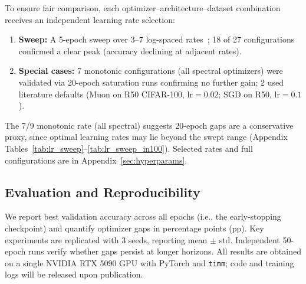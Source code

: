 To ensure fair comparison, each optimizer--architecture--dataset combination receives an independent learning rate selection:
\begin{enumerate}[label=(\alph*),nosep,leftmargin=*]
\item \textbf{Sweep:} A 5-epoch sweep over 3--7 log-spaced rates~\cite{schmidt2021crowdedvalley}; 18 of 27 configurations confirmed a clear peak (accuracy declining at adjacent rates).
\item \textbf{Special cases:} 7 monotonic configurations (all spectral optimizers) were validated via 20-epoch saturation runs confirming no further gain; 2 used literature defaults (Muon on R50 CIFAR-100, $\text{lr}{=}0.02$; SGD on R50, $\text{lr}{=}0.1$).
\end{enumerate}
The 7/9 monotonic rate (all spectral) suggests 20-epoch gaps are a conservative proxy, since optimal learning rates may lie beyond the swept range (Appendix Tables~\ref{tab:lr_sweep}--\ref{tab:lr_sweep_in100}).
Selected rates and full configurations are in Appendix~\ref{sec:hyperparams}.

\subsection{Evaluation and Reproducibility}
\label{sec:eval_protocol}

We report best validation accuracy across all epochs (i.e., the early-stopping checkpoint) and quantify optimizer gaps in percentage points (pp). Key experiments are replicated with 3 seeds, reporting mean $\pm$ std. Independent 50-epoch runs verify whether gaps persist at longer horizons. All results are obtained on a single NVIDIA RTX 5090 GPU with PyTorch and \texttt{timm}; code and training logs will be released upon publication.
\label{sec:hardware}